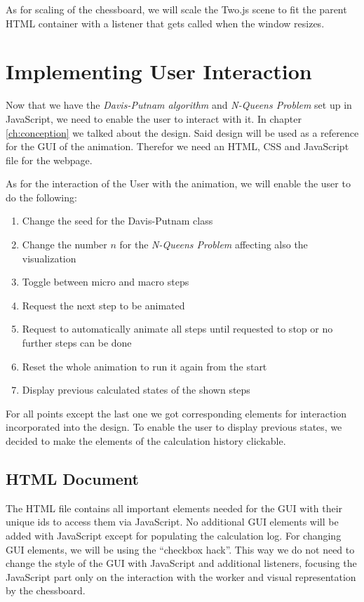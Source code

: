 As for scaling of the chessboard, we will scale the Two.js scene to fit the parent HTML container with a listener that gets called when the window resizes.

\section{Implementing User Interaction}
\label{sec:impUI}
Now that we have the \textit{Davis-Putnam algorithm} and \textit{N-Queens Problem} set up in JavaScript, we need to enable the user to interact with it. In chapter \ref{ch:conception} we talked about the design. Said design will be used as a reference for the GUI of the animation. Therefor we need an HTML, CSS and JavaScript file for the webpage.

As for the interaction of the User with the animation, we will enable the user to do the following:

\begin{enumerate}
    \item Change the seed for the Davis-Putnam class
    \item Change the number $n$ for the \textit{N-Queens Problem} affecting also the visualization
    \item Toggle between micro and macro steps
    \item Request the next step to be animated
    \item Request to automatically animate all steps until requested to stop or no further steps can be done
    \item Reset the whole animation to run it again from the start
    \item Display previous calculated states of the shown steps
\end{enumerate}

For all points except the last one we got corresponding elements for interaction incorporated into the design. To enable the user to display previous states, we decided to make the elements of the calculation history clickable.

\subsection{HTML Document}
\label{sub:impHTML}
The HTML file contains all important elements needed for the GUI with their unique ids to access them via JavaScript. No additional GUI elements will be added with JavaScript except for populating the calculation log. For changing GUI elements, we will be using the ``checkbox hack''. This way we do not need to change the style of the GUI with JavaScript and additional listeners, focusing the JavaScript part only on the interaction with the worker and visual representation by the chessboard.

